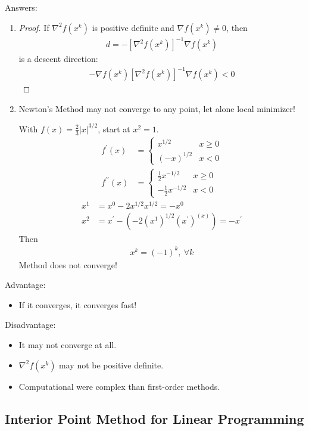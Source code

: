 \documentclass[11pt]{article}
\numberwithin{equation}{section}
\begin{document}
Answers:\begin{enumerate}
    \item \begin{proof}
        If $\nabla^{2} f(x^{k})$ is positive definite and $\nabla f\left(x^{k}\right) \neq 0$, then \begin{align*}
            d = -\left[\nabla^{2} f\left(x^{k}\right)\right]^{-1} \nabla f\left(x^{k}\right)
        \end{align*}
        is a descent direction: \begin{align*}
            -\nabla f\left(x^{k}\right)\left[\nabla^{2} f\left(x^{k}\right)\right]^{-1} \nabla f\left(x^{k}\right) < 0
        \end{align*}
    \end{proof}
    \item Newton's Method may not converge to any point, let alone local minimizer!
    \begin{example}
        With $f(x)=\frac{2}{3}|x|^{3 / 2}$, start at $x^2=1$.\begin{align*}
            f^{\prime}(x)&=\left\{\begin{array}{ll}
                x^{1/ 2} & x \geq 0 \\
                (-x)^{1/2} & x<0
                \end{array}\right. \\
            f^{\prime \prime}(x)&=\left\{\begin{array}{ll}
                \frac{1}{2} x^{-1 / 2} & x \geq 0 \\
                -\frac{1}{2} x^{-1 / 2} & x<0
                \end{array}\right.
        \end{align*}
        \begin{align*}
            x^{1} &= x^{0}-2 x^{1 / 2} x^{1 / 2}=-x^{0} \\
            x^{2} &= x^{\prime}-\left(-2\left(x^{1}\right)^{1 / 2}\left(x^{\prime}\right)^{(x)}\right)=-x^{\prime}
        \end{align*}
        Then \begin{align*}
            x^k = (-1)^k, \ \forall k
        \end{align*}
        Method does not converge!
    \end{example}
\end{enumerate}

Advantage:\begin{itemize}
    \item If it converges, it converges fast!
\end{itemize}

Disadvantage:\begin{itemize}
    \item It may not converge at all.
    \item $\nabla^{2} f\left(x^{k}\right)$ may not be positive definite.
    \item Computational were complex than first-order methods.
\end{itemize}

\subsection{Interior Point Method for Linear Programming}
\end{document}
